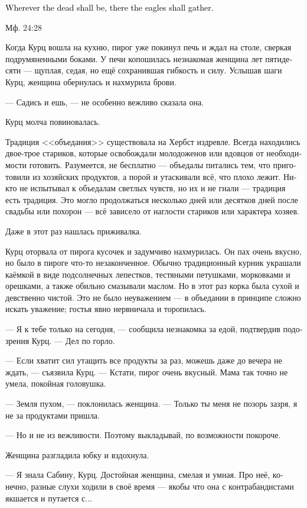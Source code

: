 \documentclass[a4paper,12pt,fleqn]{book}\usepackage{cooltooltips}\usepackage{polyglossia}\setdefaultlanguage[babelshorthands=true]{russian}\setotherlanguage{english}\defaultfontfeatures{Ligatures=TeX,Mapping=tex-text} \usepackage{xcolor}\definecolor{lightgray}{HTML}{bbbbbb}\color{lightgray}\newcommand{\ml}[3]{\textenglish{\textcolor{black}{#3}}}
\begin{document}
\epigraph
{
\ml{$0$}
{Где будут павшие, там соберутся и орлы.}
{Wherever the dead shall be, there the eagles shall gather.}
}{Мф. 24:28}

Когда Курц вошла на кухню, пирог уже покинул печь и ждал на столе, сверкая подрумяненными боками.
У печи копошилась незнакомая женщина лет пятидесяти --- щуплая, седая, но ещё сохранившая гибкость и силу.
Услышав шаги Курц, женщина обернулась и нахмурила брови.

--- Садись и ешь, --- не особенно вежливо сказала она.

Курц молча повиновалась.

Традиция <<объедания>> существовала на Хербст издревле.
Всегда находились двое-трое стариков, которые освобождали молодоженов или вдовцов от необходимости готовить.
Разумеется, не бесплатно --- объедалы питались тем, что приготовили из хозяйских продуктов, а порой и утаскивали всё, что плохо лежит.
Никто не испытывал к объедалам светлых чувств, но их и не гнали --- традиция есть традиция.
Это могло продолжаться несколько дней или десятков дней после свадьбы или похорон --- всё зависело от наглости стариков или характера хозяев.

Даже в этот раз нашлась приживалка.

Курц оторвала от пирога кусочек и задумчиво нахмурилась.
Он пах очень вкусно, но было в пироге что-то незаконченное.
Обычно традиционный курник украшали каёмкой в виде подсолнечных лепестков, тестяными петушками, морковками и орешками, а также обильно смазывали маслом.
Но в этот раз корка была сухой и девственно чистой.
Это не было неуважением --- в объедании в принципе сложно искать уважение;
гостья явно нервничала и торопилась.

--- Я к тебе только на сегодня, --- сообщила незнакомка за едой, подтвердив подозрения Курц.
--- Дел по горло.

--- Если хватит сил утащить все продукты за раз, можешь даже до вечера не ждать, --- съязвила Курц.
--- Кстати, пирог очень вкусный.
Мама так точно не умела, покойная головушка.

--- Земля пухом, --- поклонилась женщина.
--- Только ты меня не позорь зазря, я не за продуктами пришла.

--- Но и не из вежливости.
Поэтому выкладывай, по возможности покороче.

Женщина разгладила юбку и вздохнула.

--- Я знала Сабину, Курц.
Достойная женщина, смелая и умная.
Про неё, конечно, разные слухи ходили в своё время --- якобы что она с контрабандистами якшается и путается с...
\end{document}
